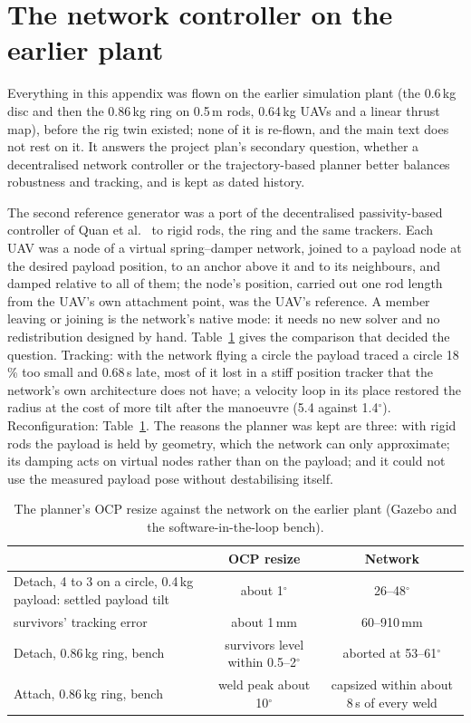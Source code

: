 \section{The network controller on the earlier plant}
\label{sec:app_network}

Everything in this appendix was flown on the earlier simulation plant (the 0.6\,kg disc and then the 0.86\,kg ring on
0.5\,m rods, 0.64\,kg UAVs and a linear thrust map), before the rig twin existed; none of it is re-flown, and the main
text does not rest on it. It answers the project plan's secondary question, whether a decentralised network controller
or the trajectory-based planner better balances robustness and tracking, and is kept as dated history.

The second reference generator was a port of the decentralised passivity-based controller of Quan et al.\
\cite{quan2025swarm} to rigid rods, the ring and the same trackers. Each UAV was a node of a virtual spring--damper
network, joined to a payload node at the desired payload position, to an anchor above it and to its neighbours, and
damped relative to all of them; the node's position, carried out one rod length from the UAV's own attachment point,
was the UAV's reference. A member leaving or joining is the network's native mode: it needs no new solver and no
redistribution designed by hand. Table~\ref{tab:detach_ab} gives the comparison that decided the question. Tracking:
with the network flying a circle the payload traced a circle 18\,\% too small and 0.68\,s late, most of it lost in a
stiff position tracker that the network's own architecture does not have; a velocity loop in its place restored the
radius at the cost of more tilt after the manoeuvre (5.4 against 1.4$^\circ$). Reconfiguration: Table~\ref{tab:detach_ab}.
The reasons the planner was kept are three: with rigid rods the payload is held by geometry, which the network can only
approximate; its damping acts on virtual nodes rather than on the payload; and it could not use the measured payload
pose without destabilising itself.

\begin{table}[h]
\centering
\small
\caption{The planner's OCP resize against the network on the earlier plant (Gazebo and the software-in-the-loop
bench).}
\label{tab:detach_ab}
\begin{tabularx}{\textwidth}{>{\raggedright\arraybackslash}Xcc}
\toprule
 & OCP resize & Network \\
\midrule
Detach, 4 to 3 on a circle, 0.4\,kg payload: settled payload tilt & about 1$^\circ$ & 26--48$^\circ$ \\
\quad survivors' tracking error & about 1\,mm & 60--910\,mm \\
Detach, 0.86\,kg ring, bench & survivors level within 0.5--2$^\circ$ & aborted at 53--61$^\circ$ \\
Attach, 0.86\,kg ring, bench & weld peak about 10$^\circ$ & capsized within about 8\,s of every weld \\
\bottomrule
\end{tabularx}
\end{table}
